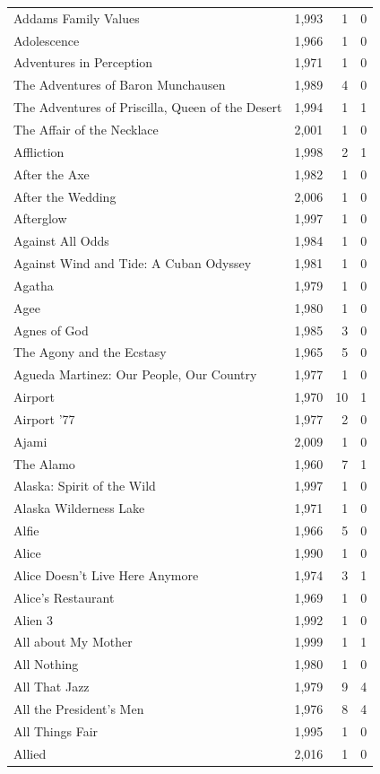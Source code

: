 \begin{tabular}{lrrr}
Addams Family Values & 1,993 & 1 & 0 \\
Adolescence & 1,966 & 1 & 0 \\
Adventures in Perception & 1,971 & 1 & 0 \\
The Adventures of Baron Munchausen & 1,989 & 4 & 0 \\
The Adventures of Priscilla, Queen of the Desert & 1,994 & 1 & 1 \\
The Affair of the Necklace & 2,001 & 1 & 0 \\
Affliction & 1,998 & 2 & 1 \\
After the Axe & 1,982 & 1 & 0 \\
After the Wedding & 2,006 & 1 & 0 \\
Afterglow & 1,997 & 1 & 0 \\
Against All Odds & 1,984 & 1 & 0 \\
Against Wind and Tide: A Cuban Odyssey & 1,981 & 1 & 0 \\
Agatha & 1,979 & 1 & 0 \\
Agee & 1,980 & 1 & 0 \\
Agnes of God & 1,985 & 3 & 0 \\
The Agony and the Ecstasy & 1,965 & 5 & 0 \\
Agueda Martinez: Our People, Our Country & 1,977 & 1 & 0 \\
Airport & 1,970 & 10 & 1 \\
Airport '77 & 1,977 & 2 & 0 \\
Ajami & 2,009 & 1 & 0 \\
The Alamo & 1,960 & 7 & 1 \\
Alaska: Spirit of the Wild & 1,997 & 1 & 0 \\
Alaska Wilderness Lake & 1,971 & 1 & 0 \\
Alfie & 1,966 & 5 & 0 \\
Alice & 1,990 & 1 & 0 \\
Alice Doesn't Live Here Anymore & 1,974 & 3 & 1 \\
Alice's Restaurant & 1,969 & 1 & 0 \\
Alien 3 & 1,992 & 1 & 0 \\
All about My Mother & 1,999 & 1 & 1 \\
All Nothing & 1,980 & 1 & 0 \\
All That Jazz & 1,979 & 9 & 4 \\
All the President's Men & 1,976 & 8 & 4 \\
All Things Fair & 1,995 & 1 & 0 \\
Allied & 2,016 & 1 & 0 \\

\end{tabular}
